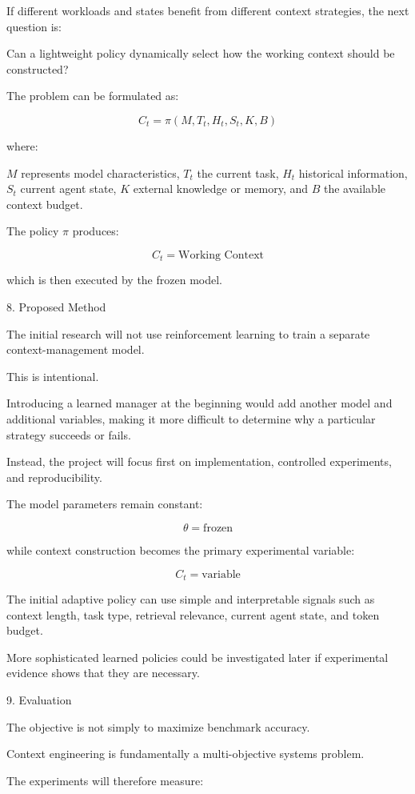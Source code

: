 If different workloads and states benefit from different context strategies, the next question is:

Can a lightweight policy dynamically select how the working context should be constructed?

The problem can be formulated as:

$$ C_t= \pi( M, T_t, H_t, S_t, K, B ) $$

where:

\(M\) represents model characteristics,
\(T_t\) the current task,
\(H_t\) historical information,
\(S_t\) current agent state,
\(K\) external knowledge or memory, and
\(B\) the available context budget.

The policy \(\pi\) produces:

$$ \boxed{C_t=\text{Working Context}} $$

which is then executed by the frozen model.

8. Proposed Method

The initial research will not use reinforcement learning to train a separate context-management model.

This is intentional.

Introducing a learned manager at the beginning would add another model and additional variables, making it more difficult to determine why a particular strategy succeeds or fails.

Instead, the project will focus first on implementation, controlled experiments, and reproducibility.

The model parameters remain constant:

$$ \boxed{\theta=\text{frozen}} $$

while context construction becomes the primary experimental variable:

$$ \boxed{C_t=\text{variable}} $$

The initial adaptive policy can use simple and interpretable signals such as context length, task type, retrieval relevance, current agent state, and token budget.

More sophisticated learned policies could be investigated later if experimental evidence shows that they are necessary.

9. Evaluation

The objective is not simply to maximize benchmark accuracy.

Context engineering is fundamentally a multi-objective systems problem.

The experiments will therefore measure:

